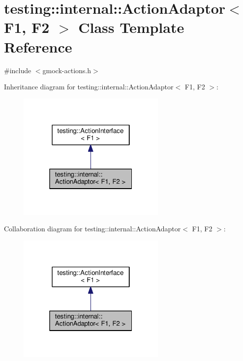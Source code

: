 \hypertarget{classtesting_1_1internal_1_1ActionAdaptor}{}\section{testing\+:\+:internal\+:\+:Action\+Adaptor$<$ F1, F2 $>$ Class Template Reference}
\label{classtesting_1_1internal_1_1ActionAdaptor}


{\ttfamily \#include $<$gmock-\/actions.\+h$>$}



Inheritance diagram for testing\+:\+:internal\+:\+:Action\+Adaptor$<$ F1, F2 $>$\+:
\nopagebreak
\begin{figure}[H]
\begin{center}
\leavevmode
\includegraphics[width=205pt]{classtesting_1_1internal_1_1ActionAdaptor__inherit__graph}
\end{center}
\end{figure}


Collaboration diagram for testing\+:\+:internal\+:\+:Action\+Adaptor$<$ F1, F2 $>$\+:
\nopagebreak
\begin{figure}[H]
\begin{center}
\leavevmode
\includegraphics[width=205pt]{classtesting_1_1internal_1_1ActionAdaptor__coll__graph}
\end{center}
\end{figure}
